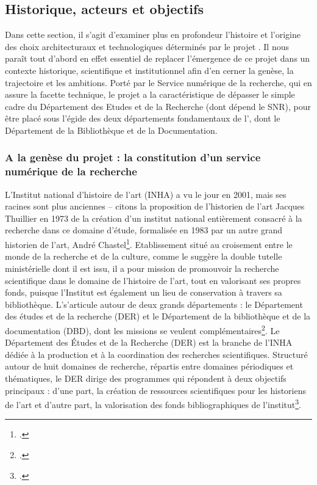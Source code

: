 \subsection{Historique, acteurs et objectifs}

Dans cette section, il s'agit d'examiner plus en profondeur l’histoire et l’origine des choix architecturaux et technologiques déterminés par le projet \pense. Il nous paraît tout d’abord en effet essentiel de replacer l’émergence de ce projet dans un contexte historique, scientifique et institutionnel afin d’en cerner la genèse, la trajectoire et les ambitions. Porté par le Service numérique de la recherche, qui en assure la facette technique, le projet a la caractéristique de dépasser le simple cadre du Département des Etudes et de la Recherche (dont dépend le SNR), pour être placé sous l’égide des deux départements fondamentaux de l’\inha, dont le Département de la Bibliothèque et de la Documentation. 

\subsubsection{A la genèse du projet : la constitution d’un service numérique de la recherche}
\newline
{}

L'Institut national d’histoire de l’art (INHA) a vu le jour en 2001, mais ses racines sont plus anciennes – citons la proposition de l’historien de l’art Jacques Thuillier en 1973 de la création d’un institut national entièrement consacré à la recherche dans ce domaine d’étude, formalisée en 1983 par un autre grand historien de l’art, André Chastel\footcite{inha_presentation_nodate}. Etablissement situé au croisement entre le monde de la recherche et de la culture, comme le suggère la double tutelle ministérielle dont il est issu, il a pour mission de promouvoir la recherche scientifique dans le domaine de l’histoire de l’art, tout en valorisant ses propres fonds, puisque l’Institut est également un lieu de conservation à travers sa bibliothèque.
L'\inha s'articule autour de deux grands départements : le Département des études et de la recherche (DER) et le Département de la bibliothèque et de la documentation (DBD), dont les missions se veulent complémentaires\footcite{inha_organisation_nodate}. 
Le Département des Études et de la Recherche (DER) est la branche de l’INHA dédiée à la production et à la coordination des recherches scientifiques. Structuré autour de huit domaines de recherche, répartis entre domaines périodiques et thématiques, le DER dirige des programmes qui répondent à deux objectifs principaux : d’une part, la création de ressources scientifiques pour les historiens de l’art et d’autre part, la valorisation des fonds bibliographiques de l’institut\footcite{inha_departement_nodate}.
\newline
{}\\

